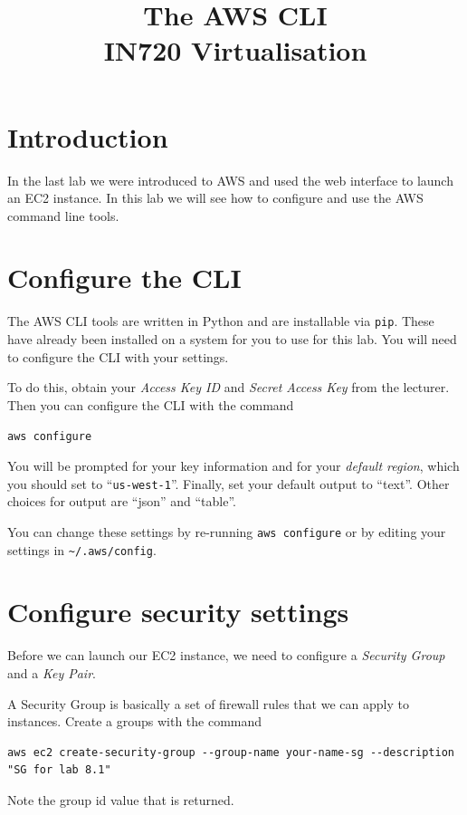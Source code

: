 \documentclass{article}
\begin{document}
\title{The AWS CLI\\ IN720 Virtualisation}
\date{}
\maketitle

\section*{Introduction}
In the last lab we were introduced to AWS and used the web interface to launch an EC2 instance. In this lab we will see how to configure and use the AWS command line tools.


\section{Configure the CLI}
The AWS CLI tools are written in Python and are installable via \texttt{pip}. These have already been installed on a system for you to use for this lab.  You will need to configure the CLI with your settings.

To do this, obtain your \emph{Access Key ID} and \emph{Secret Access Key} from the lecturer. Then you can configure the CLI with the command

\texttt{aws configure}

You will be prompted for your key information and for your \emph{default region}, which you should set to ``\texttt{us-west-1}''. Finally, set your default output to ``text''.  Other choices for output are ``json'' and ``table''.

You can change these settings by re-running \texttt{aws configure} or by editing your settings in \texttt{\textasciitilde/.aws/config}.

\section{Configure security settings}
Before we can launch our EC2 instance, we need to configure a \emph{Security Group} and a \emph{Key Pair}.

A Security Group is basically a set of firewall rules that we can apply to instances. Create a groups with the command

\begin{verbatim}
aws ec2 create-security-group --group-name your-name-sg --description "SG for lab 8.1"
\end{verbatim}

Note the group id value that is returned.
\end{document}
